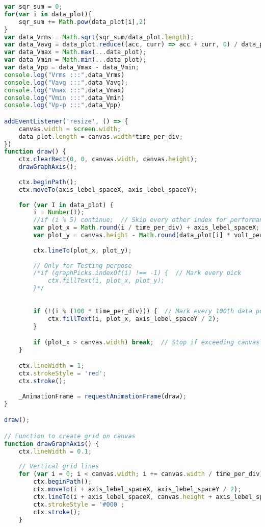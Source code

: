 \begin{lstlisting}[style=htmlcssjs, language=JavaScript]
var sqr_sum = 0;
for(var i in data_plot){
    sqr_sum += Math.pow(data_plot[i],2)
}
var data_Vrms = Math.sqrt(sqr_sum/data_plot.length);
var data_Vavg = data_plot.reduce((acc, curr) => acc + curr, 0) / data_plot.length;
var data_Vmax = Math.max(...data_plot);
var data_Vmin = Math.min(...data_plot);
var data_Vpp = data_Vmax - data_Vmin;
console.log("Vrms :::",data_Vrms)
console.log("Vavg :::",data_Vavg);
console.log("Vmax :::",data_Vmax)
console.log("Vmin :::",data_Vmin)
console.log("Vp-p :::",data_Vpp)

addEventListener('resize', () => {
    canvas.width = screen.width;
    data_plot.length = canvas.width*time_per_div;
})
function draw() {
    ctx.clearRect(0, 0, canvas.width, canvas.height);
    drawGraphAxis();
    
    ctx.beginPath();
    ctx.moveTo(axis_lebel_spaceX, axis_lebel_spaceY);
    
    for (var I in data_plot) {
        i = Number(I);
        //if (i % 5) continue;  // Skip every other index for performance
        var plot_x = Math.round(i / time_per_div) + axis_lebel_spaceX;
        var plot_y = canvas.height - Math.round(data_plot[i] * volt_per_div) + axis_lebel_spaceY + positionY;
        
        ctx.lineTo(plot_x, plot_y);
        
        // Only for Testing perpose
        /*if (graphPicks.indexOf(i) !== -1) {  // Mark every pick
            ctx.fillText(i, plot_x, plot_y);
        }*/
        
        
        if (!(i % (100 * time_per_div))) {  // Mark every 100th data point
            ctx.fillText(i, plot_x, axis_lebel_spaceY / 2);
        }

        if (plot_x > canvas.width) break;  // Stop if exceeding canvas width
    }

    ctx.lineWidth = 1;
    ctx.strokeStyle = 'red';
    ctx.stroke();
    
    _AnimationFrame = requestAnimationFrame(draw);
}

draw();

// Function to create grid on canvas
function drawGraphAxis() {
    ctx.lineWidth = 0.1;
    
    // Vertical grid lines
    for (var i = 0; i < canvas.width; i += canvas.width / time_per_div) {
        ctx.beginPath();
        ctx.moveTo(i + axis_lebel_spaceX, axis_lebel_spaceY / 2);
        ctx.lineTo(i + axis_lebel_spaceX, canvas.height + axis_lebel_spaceY);
        ctx.strokeStyle = '#000';
        ctx.stroke();
    }
    

\end{lstlisting}

